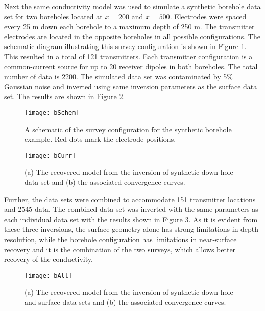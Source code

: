 Next the same conductivity model was used to simulate a synthetic borehole data set for two boreholes located at $x=200$ and $x=500$. Electrodes were spaced every 25 m down each borehole to a maximum depth of 250 m. The transmitter electrodes are located in the opposite boreholes in all possible configurations. The schematic diagram illustrating this survey configuration is shown in Figure \ref{fig:bSchem}. This resulted in a total of 121 transmitters. Each transmitter configuration is a common-current source for up to 20 receiver dipoles in both boreholes. The total number of data is 2200. The simulated data set was contaminated by 5\% Gaussian noise and inverted using same inversion parameters as the surface data set. The results are shown in Figure \ref{fig:bCurr}.
%
\begin{figure}
\centering
\texttt{[image: bSchem]}
\caption{A schematic of the survey configuration for the synthetic borehole example. Red dots mark the electrode positions.}
\label{fig:bSchem}
\end{figure}
%
\begin{figure}
\centering
\texttt{[image: bCurr]}
\caption{(a) The recovered model from the inversion of synthetic down-hole data set and (b) the associated convergence curves.}
\label{fig:bCurr}
\end{figure}

Further, the data sets were combined to accommodate 151 transmitter locations and 2545 data. The combined data set was inverted with the same parameters as each individual data set with the results shown in Figure \ref{fig:bAll}. As it is evident from these three inversions, the surface geometry alone has strong limitations in depth resolution, while the borehole configuration has limitations in near-surface recovery and it is the combination of the two surveys, which allows better recovery of the conductivity.
%
\begin{figure}
\centering
\texttt{[image: bAll]}
\caption{(a) The recovered model from the inversion of synthetic down-hole and surface data sets and (b) the associated convergence curves.}
\label{fig:bAll}
\end{figure}

